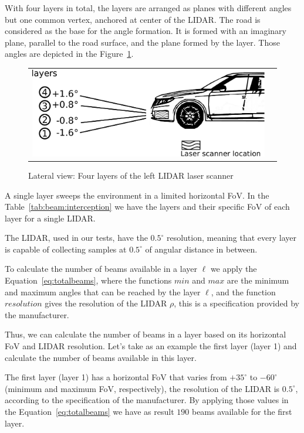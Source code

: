 With four layers in total, the layers are arranged as planes with different angles but one common vertex, anchored at center of the LIDAR. The road is considered as the base for the angle formation. It is formed with an imaginary plane, parallel to the road surface, and the plane formed by the layer. Those angles are depicted in the Figure~\ref{fig:demonstrator:lateral}.

\begin{figure}[h]
   \centering
     \begin{tabular}{lr}
       \includegraphics[scale=0.5]{img/fig:demonstrator:lateral}
     \end{tabular}
   \caption{Lateral view: Four layers of the left LIDAR laser scanner}
   \label{fig:demonstrator:lateral}
\end{figure}

A single layer sweeps the environment in a limited horizontal FoV. In the Table~\ref{tab:beam:interception} we have the layers and their specific FoV of each layer for a single LIDAR. 

The LIDAR, used in our tests, have the $0.5^{\circ}$ resolution, meaning that every layer is capable of collecting samples at $0.5^{\circ}$ of angular distance in between. 

To calculate the number of beams available in a layer $\ell$ we apply the Equation~\ref{eq:totalbeams}, where the functions $min$ and $max$ are the minimum and maximum angles that can be reached by the layer $\ell$, and the function $resolution$ gives the resolution of the LIDAR $\rho$, this is a specification provided by the manufacturer. 

Thus, we can calculate the number of beams in a layer based on its horizontal FoV and LIDAR resolution. Let's take as an example the first layer (layer 1) and calculate the number of beams available in this layer. 

The first layer (layer 1) has a horizontal FoV that varies from $+35^\circ$ to $-60^\circ$ (minimum and maximum FoV, respectively), the resolution of the LIDAR is $0.5^\circ$, according to the specification of the manufacturer. By applying those values in the Equation~\ref{eq:totalbeams} we have as result $190$ beams available for the first layer.

